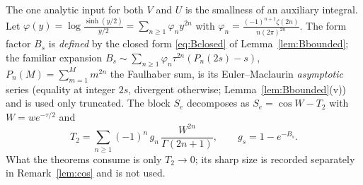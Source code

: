 \documentclass[11pt]{article}
\theoremstyle{plain}
\theoremstyle{definition}
\theoremstyle{remark}
\begin{document}
The one analytic input for both $V$ and $U$ is the smallness of an auxiliary integral. Let
$\varphi(y)=\log\frac{\sinh(y/2)}{y/2}=\sum_{n\ge1}\varphi_n y^{2n}$ with
$\varphi_n=\frac{(-1)^{n+1}\zeta(2n)}{n(2\pi)^{2n}}$. The form factor $B_s$ is \emph{defined} by
the closed form \eqref{eq:Bclosed} of Lemma~\ref{lem:Bbounded}; the familiar expansion
$B_s\sim\sum_{n\ge1}\varphi_n\tau^{2n}(P_n(2s)-s)$, $P_n(M)=\sum_{m=1}^{M}m^{2n}$ the Faulhaber
sum, is its Euler--Maclaurin \emph{asymptotic} series (equality at integer $2s$, divergent
otherwise; Lemma~\ref{lem:Bbounded}(v)) and is used only truncated. The block $S_e$ decomposes as $S_e=\cos W-T_2$ with $W=we^{-\tau/2}$ and
\begin{equation}\label{eq:T2}
   T_2=\sum_{n\ge1}(-1)^n\,g_n\,\frac{W^{2n}}{\Gamma(2n+1)},\qquad g_s=1-e^{-B_s}.
\end{equation}
What the theorems consume is only $T_2\to0$; its sharp size is recorded separately in
Remark~\ref{lem:cos} and is not used.
\end{document}
